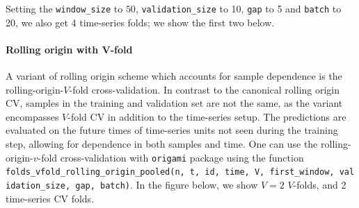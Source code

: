 \documentclass[12pt, krantz2,]{krantz}
\newenvironment{Shaded}{\begin{snugshade}}{\end{snugshade}}
\newcommand{\CommentTok}[1]{\textcolor[rgb]{0.37,0.37,0.37}{\textit{#1}}}
\newcommand{\DataTypeTok}[1]{\textcolor[rgb]{0.27,0.27,0.27}{#1}}
\newcommand{\DecValTok}[1]{\textcolor[rgb]{0.06,0.06,0.06}{#1}}
\newcommand{\KeywordTok}[1]{\textcolor[rgb]{0.27,0.27,0.27}{\textbf{#1}}}
\newcommand{\NormalTok}[1]{#1}
\newcommand{\StringTok}[1]{\textcolor[rgb]{0.5,0.5,0.5}{#1}}
\let\oldparagraph\paragraph
\renewcommand{\paragraph}[1]{\oldparagraph{#1}\mbox{}}
\theoremstyle{definition}
\theoremstyle{definition}
\theoremstyle{definition}
\newcommand{\1}{\mathbbm{1}}
\begin{document}
Setting the \texttt{window\_size} to \(50\), \texttt{validation\_size} to 10, \texttt{gap} to 5 and
\texttt{batch} to 20, we also get 4 time-series folds; we show the first two below.

\begin{Shaded}
\end{Shaded}

\hypertarget{rolling-origin-with-v-fold}{%
\paragraph{Rolling origin with V-fold}\label{rolling-origin-with-v-fold}}

A variant of rolling origin scheme which accounts for sample dependence is the
rolling-origin-\(V\)-fold cross-validation. In contrast to the canonical rolling
origin CV, samples in the training and validation set are not the same, as the
variant encompasses \(V\)-fold CV in addition to the time-series setup. The
predictions are evaluated on the future times of time-series units not seen
during the training step, allowing for dependence in both samples and time. One
can use the rolling-origin-\(v\)-fold cross-validation with \texttt{origami} package
using the function \texttt{folds\_vfold\_rolling\_origin\_pooled(n,\ t,\ id,\ time,\ V,\ first\_window,\ validation\_size,\ gap,\ batch)}. In the figure below, we show \(V=2\)
\(V\)-folds, and 2 time-series CV folds.
\end{document}
